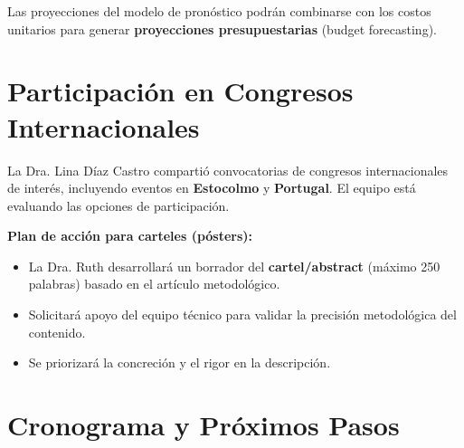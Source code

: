 \documentclass[11pt, a4paper]{article}
\begin{document}
Las proyecciones del modelo de pronóstico podrán combinarse con los costos unitarios para generar \textbf{proyecciones presupuestarias} (budget forecasting).

\vspace{0.5cm}

\section{Participación en Congresos Internacionales}

La Dra. Lina Díaz Castro compartió convocatorias de congresos internacionales de interés, incluyendo eventos en \textbf{Estocolmo} y \textbf{Portugal}. El equipo está evaluando las opciones de participación.

\textbf{Plan de acción para carteles (pósters):}
\begin{itemize}[leftmargin=1.5cm]
    \item La Dra. Ruth desarrollará un borrador del \textbf{cartel/abstract} (máximo 250 palabras) basado en el artículo metodológico.
    \item Solicitará apoyo del equipo técnico para validar la precisión metodológica del contenido.
    \item Se priorizará la concreción y el rigor en la descripción.
\end{itemize}

\vspace{0.5cm}

\section{Cronograma y Próximos Pasos}
\end{document}

